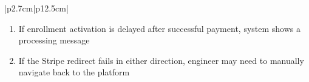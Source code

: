 \begin{table}[H]
\begin{tabular}{|p{2.7cm}|p{12.5cm}|}
\begin{minipage}[t]{\linewidth}
\begin{enumerate}[topsep=0pt,itemsep=1pt,parsep=0pt,partopsep=0pt]
                                               \item If enrollment activation is delayed after successful payment, system shows a
                                                     processing message
                                               \item If the Stripe redirect fails in either direction, engineer may need to manually
                                                     navigate back to the platform
                                           \end{enumerate}
                                       \end{minipage}                                                      \\
            \hline
        \end{tabular}
        \label{tab:eng-checkout}
    \end{table}
